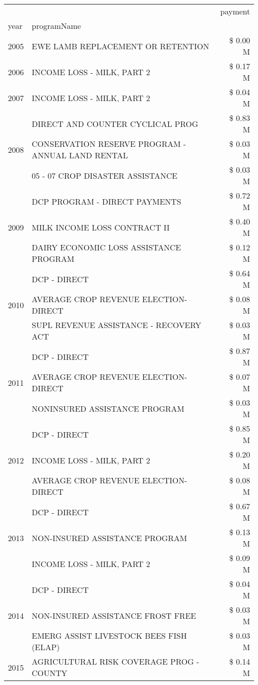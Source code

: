\begin{tabular}{llr}
\toprule
 &  & payment \\
year & programName &  \\
\midrule
2005 & EWE LAMB REPLACEMENT OR RETENTION & \$ 0.00 M \\
\cline{1-3}
2006 & INCOME LOSS - MILK, PART 2 & \$ 0.17 M \\
\cline{1-3}
2007 & INCOME LOSS - MILK, PART 2 & \$ 0.04 M \\
\cline{1-3}
\multirow[t]{3}{*}{2008} & DIRECT AND COUNTER CYCLICAL PROG & \$ 0.83 M \\
 & CONSERVATION RESERVE PROGRAM - ANNUAL LAND RENTAL & \$ 0.03 M \\
 & 05 - 07 CROP DISASTER ASSISTANCE & \$ 0.03 M \\
\cline{1-3}
\multirow[t]{3}{*}{2009} & DCP PROGRAM - DIRECT PAYMENTS & \$ 0.72 M \\
 & MILK INCOME LOSS CONTRACT II & \$ 0.40 M \\
 & DAIRY ECONOMIC LOSS ASSISTANCE PROGRAM & \$ 0.12 M \\
\cline{1-3}
\multirow[t]{3}{*}{2010} & DCP - DIRECT & \$ 0.64 M \\
 & AVERAGE CROP REVENUE ELECTION-DIRECT & \$ 0.08 M \\
 & SUPL REVENUE ASSISTANCE - RECOVERY ACT & \$ 0.03 M \\
\cline{1-3}
\multirow[t]{3}{*}{2011} & DCP - DIRECT & \$ 0.87 M \\
 & AVERAGE CROP REVENUE ELECTION-DIRECT & \$ 0.07 M \\
 & NONINSURED ASSISTANCE PROGRAM & \$ 0.03 M \\
\cline{1-3}
\multirow[t]{3}{*}{2012} & DCP - DIRECT & \$ 0.85 M \\
 & INCOME LOSS - MILK, PART 2 & \$ 0.20 M \\
 & AVERAGE CROP REVENUE ELECTION-DIRECT & \$ 0.08 M \\
\cline{1-3}
\multirow[t]{3}{*}{2013} & DCP - DIRECT & \$ 0.67 M \\
 & NON-INSURED ASSISTANCE PROGRAM & \$ 0.13 M \\
 & INCOME LOSS - MILK, PART 2 & \$ 0.09 M \\
\cline{1-3}
\multirow[t]{3}{*}{2014} & DCP - DIRECT & \$ 0.04 M \\
 & NON-INSURED ASSISTANCE FROST FREE & \$ 0.03 M \\
 & EMERG ASSIST LIVESTOCK BEES FISH (ELAP) & \$ 0.03 M \\
\cline{1-3}
\multirow[t]{3}{*}{2015} & AGRICULTURAL RISK COVERAGE PROG - COUNTY & \$ 0.14 M \\

\end{tabular}
